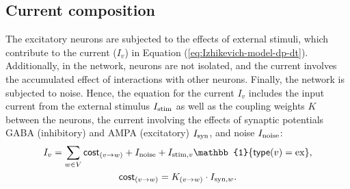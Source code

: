 \subsection{Current composition}
\label{sec:current-composition}

The excitatory neurons are subjected to the effects of external stimuli, which contribute to the current ($I_v$) in Equation (\ref{eq:Izhikevich-model-dp-dt}). Additionally, in the network, neurons are not isolated, and the current involves the accumulated effect of interactions with other neurons. Finally, the network is subjected to noise. 
Hence, the equation for the current $I_v$ includes the input current from the external stimulus $I_{\mathrm{stim}}$ as well as the coupling weights $K$ between the neurons, the current involving the effects of synaptic potentials GABA (inhibitory) and AMPA (excitatory) $I_{\mathrm{syn}}$, and noise $I_{\mathrm{noise}}$:
\begin{gather}
    I_v = 
    \sum_{w \in V} \cost_{(v \to w)} + I_\noise + I_{\stim, v} \mathbb{1} \{ \type(v) = \ex \},  \label{eq:current-components} \\
    \cost_{(v \to w)} = K_{(v \to w)} \cdot I_{\syn, w}. 
    \label{eq:cost-function}
\end{gather}

\begin{comment}

The definition of each component is provided in the next three sections.

In this project, the external input ($I_{\stim}$) is provided by a set of texture stimuli, and a grid network of PING oscillators is supposed to reflect local neural networks of the primary visual cortex (V1). The external stimuli is described in Section \ref{sec:external-stimuli}.

\end{comment}








